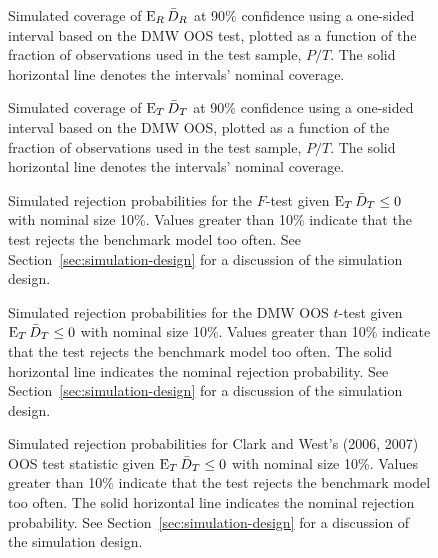 \documentclass[12pt]{article}
\begin{document}
\clearpage
\begin{figure}
   
\caption{Simulated coverage of $\operatorname{E}_R \bar{D}_{R}$ at 90\% confidence using a
  one-sided interval based on the DMW
  OOS test, plotted as a function of the fraction of
  observations used in the test sample, $P/T$.  The solid horizontal
  line denotes the intervals' nominal coverage.}
 \label{fig:interval-R}
\end{figure}
\clearpage
\begin{figure}
   
\caption{Simulated coverage of $\operatorname{E}_T \bar{D}_{T}$ at 90\% confidence using a
  one-sided interval based on the DMW
  OOS, plotted as a function of the fraction of
  observations used in the test sample, $P/T$.  The solid horizontal
  line denotes the intervals' nominal coverage.}
\label{fig:interval-T}
\end{figure}
\clearpage

\begin{figure}
  \caption{Simulated rejection probabilities for the $F$-test given
    $\operatorname{E}_T \bar{D}_{T} \leq 0$ with nominal size 10\%.  Values greater than
    10\% indicate that the test rejects the benchmark model too often.
    See Section~\ref{sec:simulation-design} for a discussion of the
    simulation design.}
  \label{fig:ftest}
\end{figure}
\clearpage
\begin{figure}
   
  \caption{Simulated rejection probabilities for the DMW
    OOS $t$-test given $\operatorname{E}_T \bar{D}_{T} \leq 0$ with nominal
    size 10\%.  Values greater than 10\% indicate that the test
    rejects the benchmark model too often.  The solid horizontal line
    indicates the nominal rejection probability.  See
    Section~\ref{sec:simulation-design} for a discussion of the
    simulation design.}
  \label{fig:ttest-size}
\end{figure}

\begin{figure}
  \caption{Simulated rejection probabilities for Clark and West's
    (2006, 2007) OOS test statistic given $\operatorname{E}_T \bar{D}_{T}
    \leq 0$ with nominal size 10\%.  Values greater than 10\% indicate
    that the test rejects the benchmark model too often.  The solid
    horizontal line indicates the nominal rejection probability.  See
    Section~\ref{sec:simulation-design} for a discussion of the
    simulation design.}
   \label{fig:clarkwest}
\end{figure}
\end{document}

